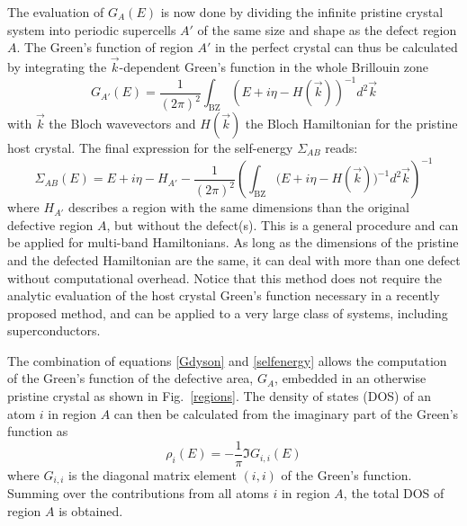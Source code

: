 The evaluation of $G_A(E)$ is now done by dividing the infinite pristine crystal system into periodic supercells $A'$ of the same size and shape as the defect region $A$.
The Green's function of region $A'$ in the perfect crystal can thus be calculated by integrating the $\vec{k}$-dependent Green's function in the whole Brillouin zone
\begin{equation}
  G_{A'}(E) =
\frac{1}{(2\pi)^2}
\int_{\text{BZ}} (E+i\eta-H(\vec{k}))^{-1} d^2\vec{k}
  \label{Gbloch}
\end{equation}
with $\vec{k}$ {the Bloch wavevectors}
and $H(\vec{k})$ the Bloch Hamiltonian for the pristine host
crystal. The final expression for the self-energy $\Sigma_{AB}$ reads:
\begin{equation}
  \Sigma_{AB}(E) = E+i\eta - H_{A'} -
\frac{1}{(2\pi)^2}
\left ({\int_{\text{BZ}}
(E+i\eta-H(\vec{k})})^{-1}d^2\vec{k} \right )^{-1}
\label{selfenergy}
\end{equation}
where $H_{A'}$ describes a region with the same dimensions than the original defective region $A$, but without the defect(s). This is a general procedure and can be applied for multi-band Hamiltonians. As long as the dimensions of the pristine and the defected Hamiltonian are the same, it can deal with more than one defect without computational overhead. Notice that this method does not require the analytic evaluation of the host crystal Green's function necessary in a recently proposed method\cite{settnes2015}, and can be applied to a very large class of systems, including superconductors.\cite{lado2016}

The combination of equations \eqref{Gdyson} and \eqref{selfenergy} allows the computation of the Green's function of the defective area, $G_A$, embedded in an otherwise pristine crystal as shown in Fig.~\ref{regions}. The density of states (DOS) of an atom $i$ in region $A$ can then be calculated from the imaginary part of the Green's function as
\begin{equation}
  \rho_{i}(E) = -\frac{1}{\pi}\Im{G_{i,i}(E)}
  \label{eq:DOS}
\end{equation}
where $G_{i,i}$ is the diagonal matrix element $(i,i)$ of the Green's function. Summing over the contributions from all atoms $i$ in region $A$, the total DOS of region $A$ is obtained.

